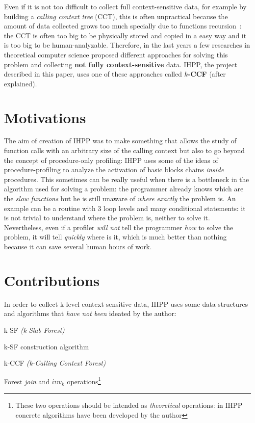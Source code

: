 \documentclass[a4paper,10pt]{report}
\begin{document}
\noindent
Even if it is not too difficult to collect full context-sensitive data,
for example by building a \emph{calling context
tree} (CCT), this is often unpractical because the amount of data collected
 grows too much specially due to functions recursion~\cite{kccf}:
the CCT is often too big to be physically stored and copied
in a easy way and it is too big to be human-analyzable.
Therefore, in the last years a few researches in theoretical computer science
proposed different approaches for solving this problem and collecting \textbf{not fully context-sensitive} data. IHPP, the project described in this paper, uses one of these approaches called \textbf{$k$-CCF} (after explained).

\section{Motivations}

The aim of creation of IHPP was to make something that allows the study of
function calls with an arbitrary size of the calling context but also to go
beyond the concept of procedure-only profiling: IHPP uses some of the ideas of
procedure-profiling to analyze the activation of basic blocks chains \emph{inside}
 procedures. This sometimes can be really useful when there is a bottleneck in
the algorithm used for solving a problem: the programmer already knows which are
the \emph{slow functions} but he is still unaware of \emph{where exactly}
the problem is. An example can be a routine with 3 loop levels and many conditional
statements: it is not trivial to understand where the problem is, neither to
solve it. Nevertheless, even if a profiler \emph{will not} tell the programmer \emph{how}
to solve the problem, it will tell \emph{quickly} where is it, which is much
better than nothing because it can save several human hours of work.

\section{Contributions}

In order to collect k-level context-sensitive data, IHPP uses some data
structures and algorithms that \emph{have not been} ideated by the author:

\begin{itemize*}
\item k-SF \emph{(k-Slab Forest)}
\item k-SF construction algorithm
\item k-CCF \emph{(k-Calling Context Forest)}
\item Forest \emph{join} and $inv_k$ operations\footnote{These two operations should
be intended as \emph{theoretical} operations: in IHPP concrete algorithms have been
developed by the author}
\end{itemize*}
\end{document}
